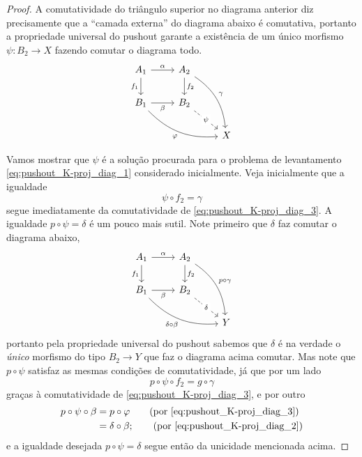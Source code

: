 \begin{proof}
  A comutatividade do triângulo superior no diagrama anterior diz precisamente que a ``camada externa'' do diagrama abaixo é comutativa, portanto a propriedade universal do pushout garante a existência de um único morfismo $\psi: B_2 \to X$ fazendo comutar o diagrama todo.
  \begin{equation}\label{eq:pushout_K-proj_diag_3}
    \begin{tikzcd}
      A_1
      \arrow[r, "\alpha"]
      \arrow[d, "f_1" swap]
      & A_2
      \arrow[d, "f_2"]
      \arrow[rdd, bend left=25, "\gamma"]
      \\ B_1
      \arrow[r, "\beta" swap]
      \arrow[rrd, bend right=25, "\varphi" swap]
      & B_2
      \arrow[rd, dashed, "\psi" description]
      \\ & & X
    \end{tikzcd}
  \end{equation}

  Vamos mostrar que $\psi$ é a solução procurada para o problema de levantamento \eqref{eq:pushout_K-proj_diag_1} considerado inicialmente.
  Veja inicialmente que a igualdade
  \begin{displaymath}
    \psi \circ f_2 = \gamma
  \end{displaymath}
  segue imediatamente da comutatividade de \eqref{eq:pushout_K-proj_diag_3}.
  A igualdade $p \circ \psi = \delta$ é um pouco mais sutil.
  Note primeiro que $\delta$ faz comutar o diagrama abaixo,
  \begin{displaymath}
    \begin{tikzcd}
      A_1
      \arrow[r, "\alpha"]
      \arrow[d, "f_1" swap]
      & A_2
      \arrow[d, "f_2"]
      \arrow[rdd, bend left=25, "p \circ \gamma"]
      \\ B_1
      \arrow[r, "\beta" swap]
      \arrow[rrd, bend right=25, "\delta \circ \beta" swap]
      & B_2
      \arrow[rd, dashed, "\delta" description]
      \\ & & Y
    \end{tikzcd}
  \end{displaymath}
  portanto pela propriedade universal do pushout sabemos que $\delta$ é na verdade o \emph{único} morfismo do tipo $B_2 \to Y$ que faz o diagrama acima comutar.
  Mas note que $p \circ \psi$ satisfaz as mesmas condições de comutatividade, já que por um lado
  \begin{displaymath}
    p \circ \psi \circ f_2 = g \circ \gamma
  \end{displaymath}
  graças à comutatividade de \eqref{eq:pushout_K-proj_diag_3}, e por outro
  \begin{align*}
    p \circ \psi \circ \beta
    & = p \circ \varphi
    \tag{por \eqref{eq:pushout_K-proj_diag_3}} \\
    & = \delta \circ \beta;
    \tag{por \eqref{eq:pushout_K-proj_diag_2}}
  \end{align*}
  e a igualdade desejada $p \circ \psi = \delta$ segue então da unicidade mencionada acima.


\end{proof}
